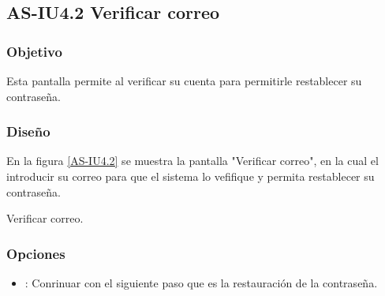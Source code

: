 %

\subsection{AS-IU4.2 Verificar correo}

\subsubsection{Objetivo}
Esta pantalla permite al  verificar su cuenta para permitirle restablecer su contraseña.

\subsubsection{Diseño}
En la figura \ref{AS-IU4.2} se muestra la pantalla "Verificar correo", en la cual el  introducir su correo para que el sistema lo vefifique y permita restablecer su contraseña.


{Verificar correo.} 

\subsubsection{Opciones}
\begin{itemize}
	\item {}: Conrinuar con el siguiente paso que es la restauración de la contraseña.
\end{itemize}

